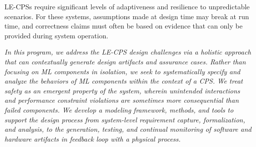 LE-CPSs require significant levels of adaptiveness and resilience to unpredictable scenarios. 
For these systems, assumptions made at design time may break at run time, and correctness claims must often be  based on evidence that can only be provided during system operation.  

\emph{In this program, we address the LE-CPS design challenges via a holistic approach that can contextually generate design artifacts and assurance cases. Rather than focusing on ML components in isolation, we seek to systematically specify and analyze the behaviors of ML components within the context of a CPS. We treat safety as an emergent property of the system, wherein unintended interactions and performance constraint violations are sometimes more consequential than failed components. We develop a modeling framework, methods, and tools to support the design process from system-level requirement capture, formalization, and analysis, to the generation, testing, and continual monitoring of software and hardware artifacts in feedback loop with a physical process.}

